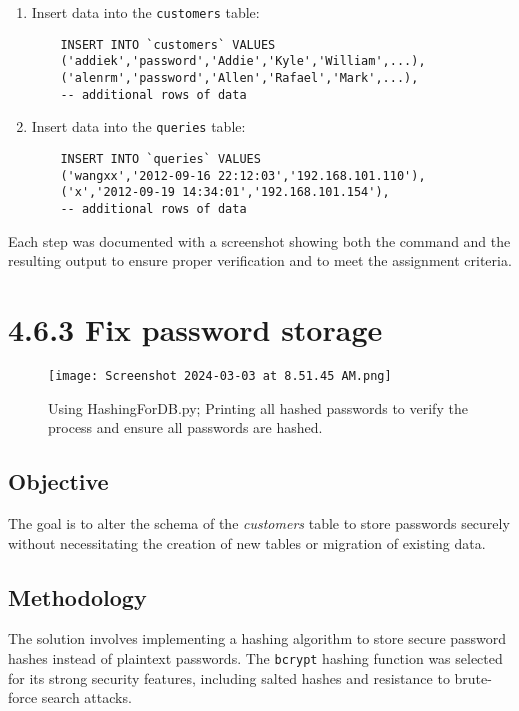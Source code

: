 \documentclass{article}
\begin{document}
\begin{enumerate}
    \item Insert data into the \texttt{customers} table:
    \begin{verbatim}
    INSERT INTO `customers` VALUES
    ('addiek','password','Addie','Kyle','William',...),
    ('alenrm','password','Allen','Rafael','Mark',...),
    -- additional rows of data
    \end{verbatim}

    \item Insert data into the \texttt{queries} table:
    \begin{verbatim}
    INSERT INTO `queries` VALUES
    ('wangxx','2012-09-16 22:12:03','192.168.101.110'),
    ('x','2012-09-19 14:34:01','192.168.101.154'),
    -- additional rows of data
    \end{verbatim}
\end{enumerate}

Each step was documented with a screenshot showing both the command and the resulting output to ensure proper verification and to meet the assignment criteria.


\section*{4.6.3 Fix password storage}

\begin{figure}[H]
    \centering
    \texttt{[image: Screenshot 2024-03-03 at 8.51.45 AM.png]}
    \caption{Using HashingForDB.py; Printing all hashed passwords to verify the process and ensure all passwords are hashed.}
\end{figure}



\subsection*{Objective}
The goal is to alter the schema of the \textit{customers} table to store passwords securely without necessitating the creation of new tables or migration of existing data.

\subsection*{Methodology}
The solution involves implementing a hashing algorithm to store secure password hashes instead of plaintext passwords. The \texttt{bcrypt} hashing function was selected for its strong security features, including salted hashes and resistance to brute-force search attacks.
\end{document}
